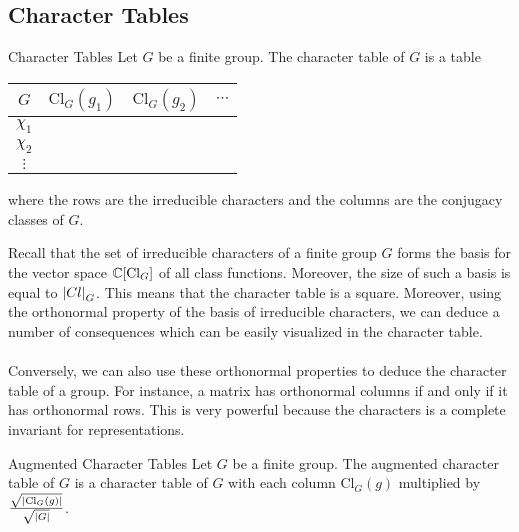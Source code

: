 \documentclass[a4paper]{article}
\begin{document}
\subsection{Character Tables}
\begin{defn}{Character Tables}{} Let $G$ be a finite group. The character table of $G$ is a table
\begin{center}
\begin{tabular}{ c|ccc } 
$G$ & $\text{Cl}_G(g_1)$ & $\text{Cl}_G(g_2)$ & $\cdots$ \\\hline
$\chi_1$ & & & \\
$\chi_2$ & & & \\
$\vdots$ & & & \\
\end{tabular}
\end{center} where the rows are the irreducible characters and the columns are the conjugacy classes of $G$. 
\end{defn}

Recall that the set of irreducible characters of a finite group $G$ forms the basis for the vector space $\mathbb{C}[\text{Cl}_G]$ of all class functions. Moreover, the size of such a basis is equal to $\abs{Cl}_G$. This means that the character table is a square. Moreover, using the orthonormal property of the basis of irreducible characters, we can deduce a number of consequences which can be easily visualized in the character table. \\~\\

Conversely, we can also use these orthonormal properties to deduce the character table of a group. For instance, a matrix has orthonormal columns if and only if it has orthonormal rows. This is very powerful because the characters is a complete invariant for representations. 

\begin{defn}{Augmented Character Tables}{} Let $G$ be a finite group. The augmented character table of $G$ is a character table of $G$ with each column $\text{Cl}_G(g)$ multiplied by $\frac{\sqrt{\abs{\text{Cl}_G(g)}}}{\sqrt{\abs{G}}}$. 
\end{defn}
\end{document}
